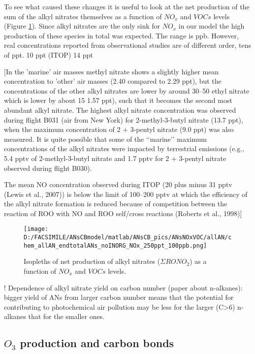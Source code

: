 \documentclass[11pt,a4paper]{article}
\begin{document}
To see what caused these changes it is useful to look at the net production of the sum of the alkyl nitrates themselves as a function of $NO_x$ and $VOCs$ levels (Figure \ref{fig:endtotalANs}). Since alkyl nitrates are the only sink for $NO_x$ in our model the high production of these species in total was expected. The range is ppb.
However, real concentrations reported from observational studies are of different order, tens of ppt.
\citep{Reeves2007} 10 ppt (ITOP) \citep{Roberts1998} 14 ppt

\citep{Reeves2007}
[In the 'marine' air masses methyl nitrate shows a slightly higher mean concentration to 'other' air masses (2.40 compared to 2.29 ppt), but the concentrations of the other alkyl
nitrates are lower by around 30–50%
ethyl nitrate which is lower by about 15%
1.57 ppt), such that it becomes the second most abundant alkyl
nitrate.
The highest alkyl
nitrate concentration was observed during flight B031 (air
from New York) for 2-methyl-3-butyl nitrate (13.7 ppt),
when the maximum concentration of 2 + 3-pentyl nitrate
(9.0 ppt) was also measured. It is quite possible that some of
the ‘‘marine’’ maximum concentrations of the alkyl nitrates
were impacted by terrestrial emissions (e.g., 5.4 pptv of
2-methyl-3-butyl nitrate and 1.7 pptv for 2 + 3-pentyl nitrate
observed during flight B030).

The mean NO concentration observed during ITOP (20 plus minus 31 pptv (Lewis et al., 2007)) is below the limit of 100–200 pptv at which the efficiency of the alkyl nitrate formation is reduced because of competition between the reaction of ROO with NO and ROO self/cross reactions (Roberts et al., 1998)]

\begin{figure} %
\texttt{[image: D:/FACSIMILE/ANsCBmodel/matlab/ANsCB\_pics/ANsNOxVOC/allAN/chem\_allAN\_endtotalANs\_noINORG\_NOx\_250ppt\_100ppb.png]}
\caption{Isopleths of net production of alkyl nitrates ($\Sigma RONO_2$) as a function of $NO_x$ and $VOCs$ levels.}\label{fig:endtotalANs}
\end{figure}

! Dependence of alkyl nitrate yield on carbon number (paper about n-alkanes): bigger yield of ANs from larger carbon number means that the potential for contributing to photochemical air pollution may be less for the larger (C>6) n-alkanes that for the smaller ones.

\subsection{$O_3$ production and carbon bonds}
\end{document}
